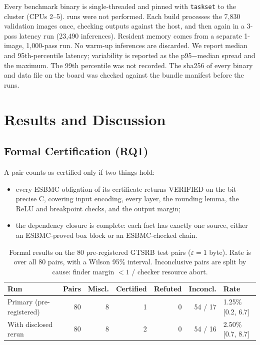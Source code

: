 Every benchmark binary is single-threaded and pinned with \texttt{taskset} to the \Aseven{} cluster (CPUs 2--5). \Athree{} runs were not performed. Each build processes the 7,830 validation images once, checking outputs against the host, and then again in a 3-pass latency run (23,490 inferences). Resident memory comes from a separate 1-image, 1,000-pass run. No warm-up inferences are discarded. We report median and 95th-percentile latency; variability is reported as the p95$-$median spread and the maximum. The 99th percentile was not recorded. The sha256 of every binary and data file on the board was checked against the bundle manifest before the runs.

\section{Results and Discussion}
\label{sec:results}

\subsection{Formal Certification (RQ1)}
A pair counts as certified only if two things hold:
\begin{itemize}
  \item every ESBMC obligation of its certificate returns VERIFIED on the bit-precise C, covering input encoding, every layer, the rounding lemma, the ReLU and breakpoint checks, and the output margin;
  \item the dependency closure is complete: each fact has exactly one source, either an ESBMC-proved box block or an ESBMC-checked chain.
\end{itemize}

\begin{table}[t]
\centering
\caption{Formal results on the 80 pre-registered GTSRB test pairs ($\varepsilon = 1$ byte). Rate is over all 80 pairs, with a Wilson 95\% interval. Inconclusive pairs are split by cause: finder margin $<1$ / checker resource abort.}
\label{tab:formal}
\scriptsize
\begin{tabular}{lrrrrrl}
\toprule
Run & Pairs & Miscl. & Certified & Refuted & Inconcl. & Rate\\
\midrule
Primary (pre-registered) & 80 & 8 & 1 & 0 & 54 / 17 & 1.25\% [0.2, 6.7]\\
With disclosed rerun & 80 & 8 & 2 & 0 & 54 / 16 & 2.50\% [0.7, 8.7]\\
\bottomrule
\end{tabular}
\end{table}

